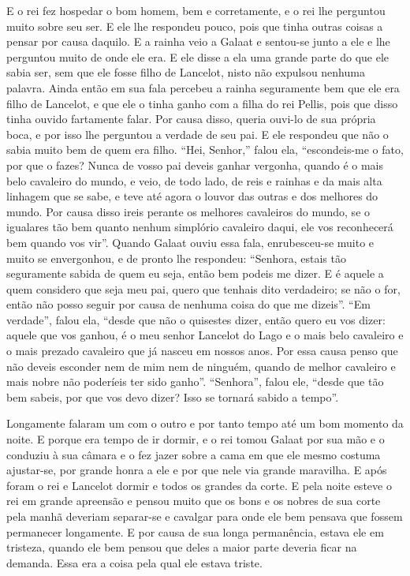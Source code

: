 E o rei fez hospedar o bom homem, bem e corretamente, e o rei lhe perguntou
muito sobre seu ser. E ele lhe respondeu pouco, pois que tinha outras coisas a
pensar por causa daquilo. E a rainha veio a Galaat e sentou-se junto a ele e
lhe perguntou muito de onde ele era. E ele disse a ela uma grande parte do que
ele sabia ser, sem que ele fosse filho de Lancelot, nisto não expulsou nenhuma
palavra. Ainda então em sua fala percebeu a rainha seguramente bem que ele era
filho de Lancelot, e que ele o tinha ganho com a filha do rei Pellis,  pois
que disso tinha ouvido fartamente falar. Por causa disso, queria ouvi-lo de sua
própria boca, e por isso lhe perguntou a verdade de seu pai. E ele respondeu
que não o sabia muito bem de quem era filho. “Hei, Senhor,” falou ela,
“escondeis-me o fato, por que o fazes? Nunca de vosso pai deveis ganhar
vergonha, quando é o mais belo cavaleiro do mundo, e veio, de todo lado, de
reis e rainhas e da mais alta linhagem que se sabe, e teve até agora o louvor
das outras e dos melhores do mundo. Por causa disso ireis perante os melhores
cavaleiros do mundo, se o igualares tão bem quanto nenhum simplório cavaleiro
daqui, ele vos reconhecerá bem quando vos vir”. Quando Galaat ouviu
essa fala, enrubesceu-se muito e muito se envergonhou, e de pronto lhe
respondeu: “Senhora, estais tão seguramente sabida de quem eu seja, então bem
podeis me dizer. E é aquele a quem considero que seja meu pai, quero que
tenhais dito verdadeiro; se não o for, então não posso seguir por causa de
nenhuma coisa do que me dizeis”. “Em verdade”, falou ela, “desde que não o
quisestes dizer, então quero eu vos dizer: aquele que vos ganhou, é o meu
senhor Lancelot do Lago e o mais belo cavaleiro e o mais prezado cavaleiro que
já nasceu em nossos anos. Por essa causa penso que não deveis esconder nem de
mim nem de ninguém, quando de melhor cavaleiro e mais nobre não poderíeis ter
sido ganho”. “Senhora”, falou ele, “desde que tão bem sabeis, por que vos devo
dizer? Isso se tornará sabido a tempo”.

Longamente falaram um com o outro e por tanto tempo até um bom momento da noite.
E porque era tempo de ir dormir, e o rei tomou Galaat por sua mão e o conduziu
à sua câmara e o fez jazer sobre a cama em que ele mesmo costuma ajustar-se,
por grande honra a ele e por que nele via grande maravilha. E após foram o rei
e Lancelot dormir e todos os grandes da corte. E pela noite esteve o rei em
grande apreensão e pensou muito que os bons e os nobres de sua corte pela manhã
deveriam separar-se e cavalgar para onde ele bem pensava que fossem permanecer
longamente. E por causa de sua longa permanência, estava ele em tristeza,
quando ele bem pensou que deles a maior parte deveria ficar na demanda. Essa
era a coisa pela qual ele estava triste.

